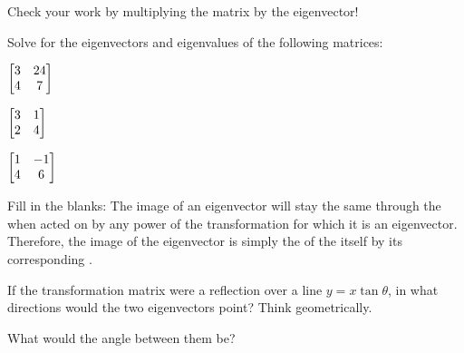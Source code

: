 \documentclass[../gatm_answers.tex]{subfiles}
\begin{document}
\begin{inner_problem}
\item Check your work by multiplying the matrix by the eigenvector!
\end{inner_problem}

\begin{outer_problem}
\item Solve for the eigenvectors and eigenvalues of the following matrices:
\end{outer_problem}

\begin{inner_problem}[start=1]
\item $\begin{bmatrix} 3 & 24 \\ 4 & 7 \end{bmatrix}$
\end{inner_problem}

\begin{inner_problem}
\item $\begin{bmatrix} 3 & 1 \\ 2 & 4 \end{bmatrix}$
\end{inner_problem}

\begin{inner_problem}
\item $\begin{bmatrix} 1 & -1 \\ 4 & 6 \end{bmatrix}$
\end{inner_problem}

\begin{outer_problem}
\item Fill in the blanks: The image of an eigenvector will stay the same \underline{\phantom{00000}} through the \underline{\phantom{00000}} when acted on by any power of the transformation \underline{\phantom{00000}} for which it is an eigenvector. Therefore, the image of the eigenvector is simply the \underline{\phantom{00000}} of the \underline{\phantom{00000}} itself by its corresponding \underline{\phantom{00000}}.
\end{outer_problem}

\begin{outer_problem}
\item
\end{outer_problem}

\begin{inner_problem}[start=1]
\item If the transformation matrix were a reflection over a line $y=x\tan\theta$, in what directions would the two eigenvectors point? Think geometrically.
\end{inner_problem}

\begin{inner_problem}
\item What would the angle between them be?
\end{inner_problem}
\end{document}

